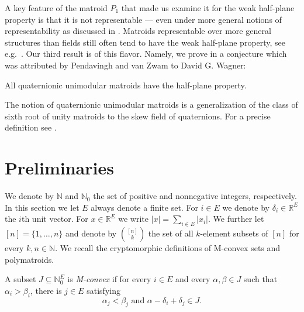 \documentclass[11pt]{article}
\theoremstyle{definition}
\providecommand{\eg}{e.g.\ }
\numberwithin{equation}{section}
\newcommand{\N}{{\mathbb N}}
\newcommand{\R}{{\mathbb R}}
\begin{document}
A key feature of the matroid $P_1$ that made us examine it for the weak half-plane property is that it is not representable --- even under more general notions of representability as discussed in \cite{skewpartial}. Matroids representable over more general structures than fields still often tend to have the weak half-plane property, see \eg \cite{NonPappus}. Our third result is of this flavor. Namely, we prove in  a conjecture which was attributed by Pendavingh and van Zwam to David G. Wagner:

\begin{con*}
    All quaternionic unimodular matroids have the half-plane property.
\end{con*}

The notion of quaternionic unimodular matroids is a generalization of the class of sixth root of unity matroids to the skew field of quaternions. For a precise definition see .

\section{Preliminaries}
We denote by $\N$ and $\N_0$ the set of positive and nonnegative integers, respectively.
In this section we let $E$ always denote a finite set. For $i\in E$ we denote by $\delta_i\in\R^E$ the $i$th unit vector. For $x\in\R^E$ we write $|x|=\sum_{i\in E}|x_i|$. We further let $[n]=\{1,\ldots,n\}$ and denote by $\binom{[n]}{k}$ the set of all $k$-element subsets of $[n]$ for every $k,n\in\N$. We recall the cryptomorphic definitions of M-convex sets and polymatroids.

\begin{Def}
     A subset $J\subseteq\N_0^E$ is \emph{M-convex} if for every $i\in E$ and every $\alpha,\beta\in J$ such that $\alpha_i>\beta_i$, there is $j\in E$ satisfying
            \begin{equation*}
                \alpha_j<\beta_j\textrm{ and }\alpha-\delta_i+\delta_j\in J.
            \end{equation*}
\end{Def}
\end{document}
